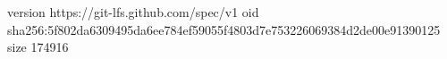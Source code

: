 version https://git-lfs.github.com/spec/v1
oid sha256:5f802da6309495da6ee784ef59055f4803d7e753226069384d2de00e91390125
size 174916
